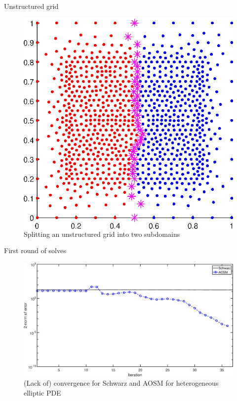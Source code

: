\documentclass{beamer}
\begin{document}
\begin{frame}{Unstructured grid}
\begin{figure}
	\begin{columns}
	\centering
	\includegraphics[height=0.6\textheight]{AOSM/PLOT_LonelandSubdomains_Seminar.eps}
	\caption{Splitting an unstructured grid into two subdomains}
	\end{columns}
\end{figure}
\end{frame}

\begin{frame}{First round of solves}
\begin{figure}
	\centering
	\includegraphics[width=\textwidth]{AOSM/PLOT_LonelandFirst_Seminar.eps}
	\caption{(Lack of) convergence for Schwarz and AOSM for heterogeneous elliptic PDE}
\end{figure}
\end{frame}
\end{document}
